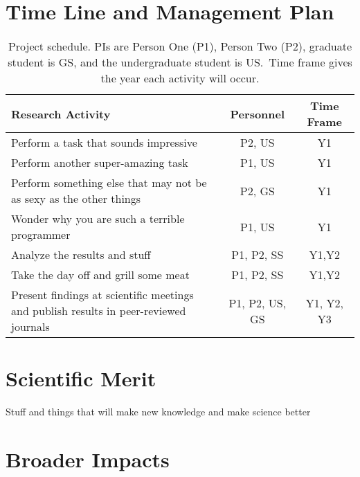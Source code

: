 \section{Time Line and Management Plan}

\begin{table}[H]
\label{table1}
\renewcommand{\arraystretch}{0}
\caption{Project schedule.  PIs are Person One (P1), Person Two (P2), graduate student is GS, and the undergraduate student is US.\ Time frame gives the year each activity will occur.}
\scriptsize
\begin{tabularx}{\textwidth}{Y c c }
\hline
\hline
\textbf{Research Activity} & \textbf{Personnel} & \textbf{Time Frame}\\
\hline
Perform a task that sounds impressive & P2, US & Y1 \T\\
Perform another super-amazing task & P1, US & Y1 \T\\
Perform something else that may not be as sexy as the other things & P2, GS & Y1 \T\\
Wonder why you are such a terrible programmer & P1, US & Y1 \T\\
Analyze the results and stuff & P1, P2, SS & Y1,Y2 \T\\
Take the day off and grill some meat & P1, P2, SS & Y1,Y2 \T\\
Present findings at scientific meetings and publish results in peer-reviewed journals & P1, P2, US, GS & Y1, Y2, Y3\T\B\\
\hline
\hline
\end{tabularx}
\end{table}

\section{Scientific Merit}

Stuff and things that will make new knowledge and make science better



\section{Broader Impacts}
\label{broadimpacts}
\vspace*{-8pt}


